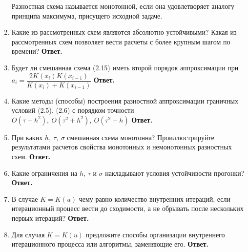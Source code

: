 \documentclass{article}
\begin{document}
\begin{enumerate}
		 Разностная схема называется монотонной, если она удовлетворяет аналогу принципа максимума, присущего
		 исходной задаче.
		\item Какие из рассмотренных схем являются абсолютно устойчивыми? Какая из рассмотренных схем позволяет вести
		расчеты с более крупным шагом по времени?
		\newline 
		{\bfseries Ответ. } 
		\item Будет ли смешанная схема (2.15) иметь второй порядок
		аппроксимации при $a_i = \dfrac{2 K(x_i) K(x_{i-1})}{K(x_i) + K(x_{i-1})}$
		\newline
		{\bfseries Ответ. } 
		\item Какие методы (способы) построения разностной аппроксимации граничных условий 
		(2.5), (2.6) с порядком точности $O(\tau + h^2), \ O(\tau^2 + h^2), \ O(\tau^2 + h)$
		\newline
		{\bfseries Ответ. } 
		\item При каких $h, \ \tau, \ \sigma$ смешанная схема монотонна? Проиллюстрируйте результатами расчетов свойства монотонных
		и немонотонных разностных схем.
		\newline
		{\bfseries Ответ. } 
		\item Какие ограничения на $h$, $\tau$ и $\sigma$ накладывают условия
		устойчивости прогонки?
		\newline
		{\bfseries Ответ. } 
		\item В случае $K = K(u)$ чему равно количество внутренних итераций, если итерационный процесс вести до сходимости,
		а не обрывать после нескольких первых итераций?
		\newline
		{\bfseries Ответ. } 
		\item Для случая $K = K(u)$ предложите способы организации
		внутреннего итерационного процесса или алгоритмы, заменяющие его.
		\newline
		{\bfseries Ответ. } 
	\end{enumerate}
\end{document}
